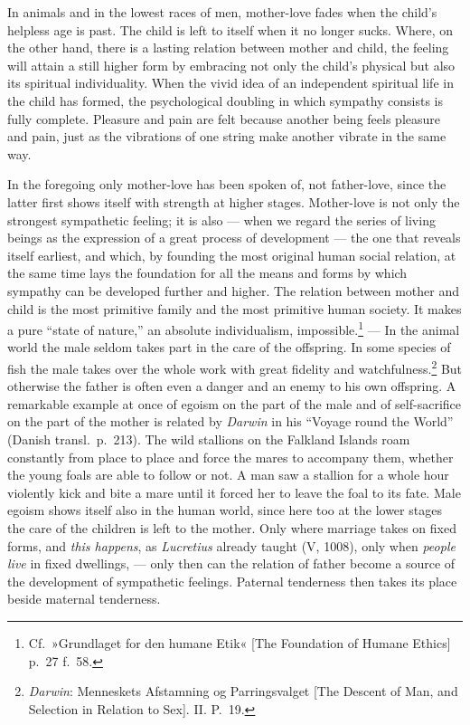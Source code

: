\documentclass[12pt,a4paper]{book}
\newcommand{\opage}[1]{\marginnote{\footnotesize\textit{[#1]}}}
\begin{document}
In animals and in the lowest races of men, mother-love fades when the
child's helpless age is past. The child is left to itself when it no
longer sucks. Where, on the other hand, there is a lasting relation
between mother and child, the feeling will attain a still higher form by
embracing not only the child's physical but also its spiritual
individuality. When the vivid idea of an independent spiritual life in
the child has formed, the psychological doubling in which sympathy
consists is fully complete. Pleasure and pain are felt because another
being feels pleasure and pain, just as the vibrations of one string make
another vibrate in the same way.

In the foregoing only mother-love has been spoken of, not father-love,
since the latter first shows itself with strength at higher stages.
Mother-love is not only the strongest sympathetic feeling; it is also
--- when we regard the series of living beings as the expression of a
great process of development --- the one that reveals itself earliest,
and which, by founding the most original human social relation, at the
same time lays the foundation for all the means and forms by which
sympathy can be developed further and higher. The relation between
mother and child is the most primitive family and the most primitive
human society. It makes a pure ``state of nature,'' an absolute
individualism, impossible.\footnote{Cf.\ »Grundlaget for den humane
Etik« [The Foundation of Humane Ethics] p.~27 f.\ 58.} --- In the animal
world the male seldom takes part in the care of the offspring. In some
species of fish the male takes over the whole work with great fidelity
and
watchfulness.\footnote{\emph{Darwin}: Menneskets Afstamning og
Parringsvalget [The Descent of Man, and Selection in Relation to Sex].
II. P.~19.} But otherwise the father is often even a danger and an
enemy to his own offspring. A remarkable example at once of egoism on
the part of the male and of self-sacrifice on the part of the mother is
related by \emph{Darwin} in his ``Voyage round the World'' (Danish
transl.\ p.~213). The wild stallions on the Falkland Islands roam
constantly from place to place and force the mares to accompany them,
whether the young foals are able to
\opage{300}follow or not. A man saw a stallion for a whole hour violently
kick and bite a mare until it forced her to leave the foal to its fate.
Male egoism shows itself also in the human world, since here too at the
lower stages the care of the children is left to the mother. Only where
marriage takes on fixed forms, and \emph{this happens}, as
\emph{Lucretius} already taught (V, 1008), only when \emph{people live}
in fixed dwellings, --- only then can the relation of father become a
source of the development of sympathetic feelings. Paternal tenderness
then takes its place beside maternal tenderness.
\end{document}
